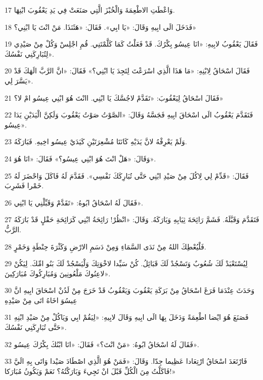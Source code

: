 \par 17 وَاعْطَتِ الاطْعِمَةَ وَالْخُبْزَ الَّتِي صَنَعَتْ فِي يَدِ يَعْقُوبَ ابْنِهَا.
\par 18 فَدَخَلَ الَى ابِيهِ وَقَالَ: «يَا ابِي». فَقَالَ: «هَئَنَذَا. مَنْ انْتَ يَا ابْنِي؟»
\par 19 فَقَالَ يَعْقُوبُ لابِيهِ: «انَا عِيسُو بِكْرُكَ. قَدْ فَعَلْتُ كَمَا كَلَّمْتَنِي. قُمِ اجْلِسْ وَكُلْ مِنْ صَيْدِي لِتُبَارِكَنِي نَفْسُكَ».
\par 20 فَقَالَ اسْحَاقُ لِابْنِهِ: «مَا هَذَا الَّذِي اسْرَعْتَ لِتَجِدَ يَا ابْنِي؟» فَقَالَ: «انَّ الرَّبَّ الَهَكَ قَدْ يَسَّرَ لِي».
\par 21 فَقَالَ اسْحَاقُ لِيَعْقُوبَ: «تَقَدَّمْ لاجُسَّكَ يَا ابْنِي. اانْتَ هُوَ ابْنِي عِيسُو امْ لا؟»
\par 22 فَتَقَدَّمَ يَعْقُوبُ الَى اسْحَاقَ ابِيهِ فَجَسَّهُ وَقَالَ: «الصَّوْتُ صَوْتُ يَعْقُوبَ وَلَكِنَّ الْيَدَيْنِ يَدَا عِيسُو».
\par 23 وَلَمْ يَعْرِفْهُ لانَّ يَدَيْهِ كَانَتَا مُشْعِرَتَيْنِ كَيَدَيْ عِيسُو اخِيهِ. فَبَارَكَهُ.
\par 24 وَقَالَ: «هَلْ انْتَ هُوَ ابْنِي عِيسُو؟» فَقَالَ: «انَا هُوَ».
\par 25 فَقَالَ: «قَدِّمْ لِي لِاكُلَ مِنْ صَيْدِ ابْنِي حَتَّى تُبَارِكَكَ نَفْسِي». فَقَدَّمَ لَهُ فَاكَلَ وَاحْضَرَ لَهُ خَمْرا فَشَرِبَ.
\par 26 فَقَالَ لَهُ اسْحَاقُ ابُوهُ: «تَقَدَّمْ وَقَبِّلْنِي يَا ابْنِي».
\par 27 فَتَقَدَّمَ وَقَبَّلَهُ. فَشَمَّ رَائِحَةَ ثِيَابِهِ وَبَارَكَهُ. وَقَالَ: «انْظُرْ! رَائِحَةُ ابْنِي كَرَائِحَةِ حَقْلٍ قَدْ بَارَكَهُ الرَّبُّ.
\par 28 فَلْيُعْطِكَ اللهُ مِنْ نَدَى السَّمَاءِ وَمِنْ دَسَمِ الارْضِ وَكَثْرَةَ حِنْطَةٍ وَخَمْرٍ.
\par 29 لِيُسْتَعْبَدْ لَكَ شُعُوبٌ وَتَسْجُدْ لَكَ قَبَائِلُ. كُنْ سَيِّدا لاخْوَتِكَ وَلْيَسْجُدْ لَكَ بَنُو امِّكَ. لِيَكُنْ لاعِنُوكَ مَلْعُونِينَ وَمُبَارِكُوكَ مُبَارَكِينَ».
\par 30 وَحَدَثَ عِنْدَمَا فَرَغَ اسْحَاقُ مِنْ بَرَكَةِ يَعْقُوبَ وَيَعْقُوبُ قَدْ خَرَجَ مِنْ لَدُنْ اسْحَاقَ ابِيهِ انَّ عِيسُوَ اخَاهُ اتَى مِنْ صَيْدِهِ
\par 31 فَصَنَعَ هُوَ ايْضا اطْعِمَةً وَدَخَلَ بِهَا الَى ابِيهِ وَقَالَ لابِيهِ: «لِيَقُمْ ابِي وَيَاكُلْ مِنْ صَيْدِ ابْنِهِ حَتَّى تُبَارِكَنِي نَفْسُكَ».
\par 32 فَقَالَ لَهُ اسْحَاقُ ابُوهُ: «مَنْ انْتَ؟» فَقَالَ: «انَا ابْنُكَ بِكْرُكَ عِيسُو».
\par 33 فَارْتَعَدَ اسْحَاقُ ارْتِعَادا عَظِيما جِدّا. وَقَالَ: «فَمَنْ هُوَ الَّذِي اصْطَادَ صَيْدا وَاتَى بِهِ الَيَّ فَاكَلْتُ مِنَ الْكُلِّ قَبْلَ انْ تَجِيءَ وَبَارَكْتُهُ؟ نَعَمْ وَيَكُونُ مُبَارَكا!»
